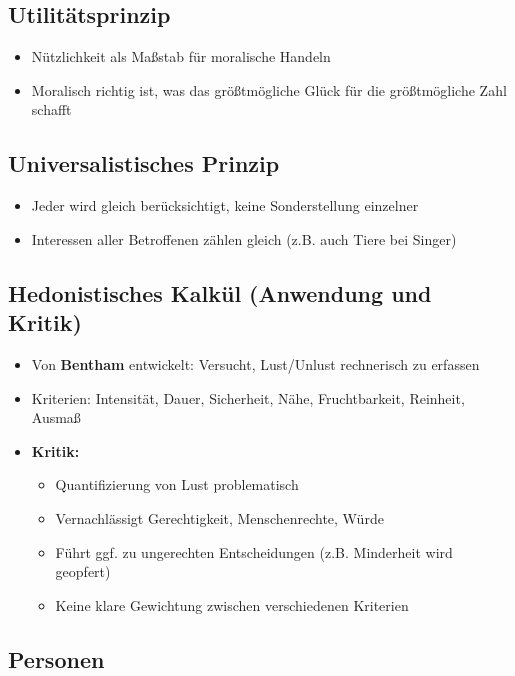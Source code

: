 \subsection{Utilitätsprinzip}
\begin{itemize}
    \item Nützlichkeit als Maßstab für moralische Handeln
    \item Moralisch richtig ist, was das größtmögliche Glück für die größtmögliche Zahl schafft
\end{itemize}

\subsection{Universalistisches Prinzip}
\begin{itemize}
    \item Jeder wird gleich berücksichtigt, keine Sonderstellung einzelner 
    \item Interessen aller Betroffenen zählen gleich (z.B. auch Tiere bei Singer)
\end{itemize}

\subsection{Hedonistisches Kalkül (Anwendung und Kritik)}
\begin{itemize}
    \item Von \textbf{Bentham} entwickelt: Versucht, Lust/Unlust rechnerisch zu erfassen
    \item Kriterien: Intensität, Dauer, Sicherheit, Nähe, Fruchtbarkeit, Reinheit, Ausmaß
    \item \textbf{Kritik:}
    \begin{itemize}
        \item Quantifizierung von Lust problematisch
        \item Vernachlässigt Gerechtigkeit, Menschenrechte, Würde
        \item Führt ggf. zu ungerechten Entscheidungen (z.B. Minderheit wird geopfert)
        \item Keine klare Gewichtung zwischen verschiedenen Kriterien
    \end{itemize}
\end{itemize}


\subsection{Personen}



